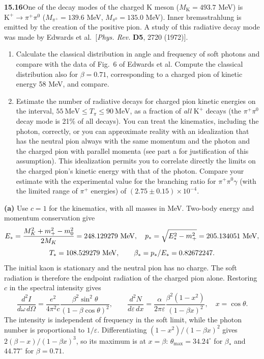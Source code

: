 \par\bigskip
\noindent\textbf{15.16}\quad One of the decay modes of the charged K meson ($M_{\mathrm{K}}=493.7$ MeV) is $\mathrm{K}^{+}\to\pi^{+}\pi^{0}$ ($M_{\pi^{+}}=139.6$ MeV, $M_{\pi^{0}}=135.0$ MeV). Inner bremsstrahlung is emitted by the creation of the positive pion. A study of this radiative decay mode was made by Edwards et al.\ [\emph{Phys. Rev.} \textbf{D5}, 2720 (1972)].
\begin{enumerate}
\item[(a)] Calculate the classical distribution in angle and frequency of soft photons and compare with the data of Fig.~6 of Edwards et al. Compute the classical distribution also for $\beta=0.71$, corresponding to a charged pion of kinetic energy 58 MeV, and compare.
\item[(b)] Estimate the number of radiative decays for charged pion kinetic energies on the interval, $55\ \mathrm{MeV}\leq T_{\pi}\leq90\ \mathrm{MeV}$, as a fraction of \emph{all} $\mathrm{K}^{+}$ decays (the $\pi^{+}\pi^{0}$ decay mode is 21\% of all decays). You can treat the kinematics, including the photon, correctly, or you can approximate reality with an idealization that has the neutral pion always with the same momentum and the photon and the charged pion with parallel momenta (see part a for justification of this assumption). This idealization permits you to correlate directly the limits on the charged pion's kinetic energy with that of the photon.  Compare your estimate with the experimental value for the branching ratio for $\pi^{+}\pi^{0}\gamma$ (with the limited range of $\pi^{+}$ energies) of $(2.75\pm0.15)\times10^{-4}$.
\end{enumerate}
\solution

\medskip\noindent\textbf{(a)} Use $c=1$ for the kinematics, with all
masses in MeV.  Two-body energy and momentum conservation give
\[
E_* =\frac{M_K^2+m_+^2-m_0^2}{2M_K}=248.129279\ {\rm MeV},
\quad p_* =\sqrt{E_*^2-m_+^2}=205.134051\ {\rm MeV},
\]
\[
T_*=108.529279\ {\rm MeV},\qquad \beta_*=p_*/E_*=0.82672247.
\]
The initial kaon is stationary and the neutral pion has no charge.
The soft radiation is therefore the endpoint radiation of the charged
pion alone.  Restoring $c$ in the spectral intensity gives
\[
\boxed{\frac{d^2I}{d\omega\,d\Omega}
=\frac{e^2}{4\pi^2c}\frac{\beta^2\sin^2\theta}
 {(1-\beta\cos\theta)^2},\qquad
\frac{d^2N}{d\varepsilon\,dx}
=\frac{\alpha}{2\pi\varepsilon}
 \frac{\beta^2(1-x^2)}{(1-\beta x)^2},\quad x=\cos\theta.}
\]
The intensity is independent of frequency in the soft limit, while
the photon number is proportional to $1/\varepsilon$.  Differentiating
$(1-x^2)/(1-\beta x)^2$ gives
$2(\beta-x)/(1-\beta x)^3$, so its maximum is at
$x=\beta$: $\theta_{\max}=34.24^\circ$ for $\beta_*$ and
$44.77^\circ$ for $\beta=0.71$.

